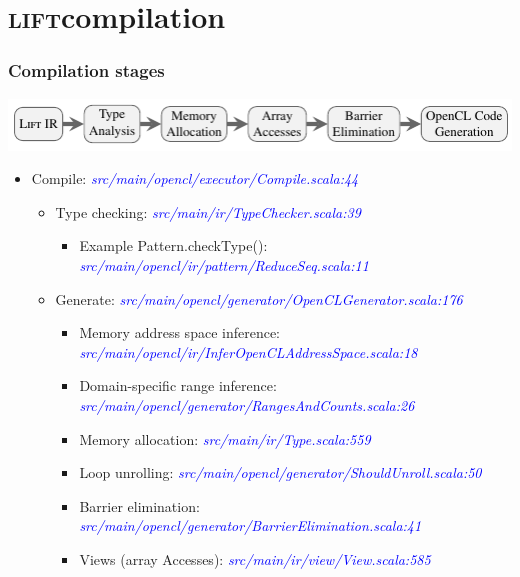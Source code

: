 \documentclass[10pt]{beamer}
\newcommand{\lift}{\textsc{lift}\space}
\newcommand{\srcurl}[1]{\textcolor{blue}{\textit{#1}}}
\begin{document}
\section{\lift compilation}

\begin{frame}[t]
\frametitle{Compilation stages}
    \vspace{-1cm}
    \begin{block}{}
        \begin{center}
            \includegraphics[width=1\textwidth]{../images/compilation_stages.pdf}
        \end{center}
    \end{block}
    \vspace{-0.5cm}
\begin{itemize}
    \item Compile: \srcurl{src/main/opencl/executor/Compile.scala:44}
    \begin{itemize}
    	\item Type checking: \srcurl{src/main/ir/TypeChecker.scala:39}
    	\begin{itemize}
    		\item Example Pattern.checkType(): \srcurl{src/main/opencl/ir/pattern/ReduceSeq.scala:11}
    	\end{itemize}
    	\item Generate: \srcurl{src/main/opencl/generator/OpenCLGenerator.scala:176}
    	\begin{itemize}
    		\item Memory address space inference: \srcurl{src/main/opencl/ir/InferOpenCLAddressSpace.scala:18}
    		\item Domain-specific range inference: \srcurl{src/main/opencl/generator/RangesAndCounts.scala:26}
    		\item Memory allocation: \srcurl{src/main/ir/Type.scala:559}
    		\item Loop unrolling: \srcurl{src/main/opencl/generator/ShouldUnroll.scala:50}
    		\item Barrier elimination: \srcurl{src/main/opencl/generator/BarrierElimination.scala:41}
    		\item Views (array Accesses): \srcurl{src/main/ir/view/View.scala:585}
    	\end{itemize}
    \end{itemize}
\end{itemize}
\end{frame}
\end{document}
